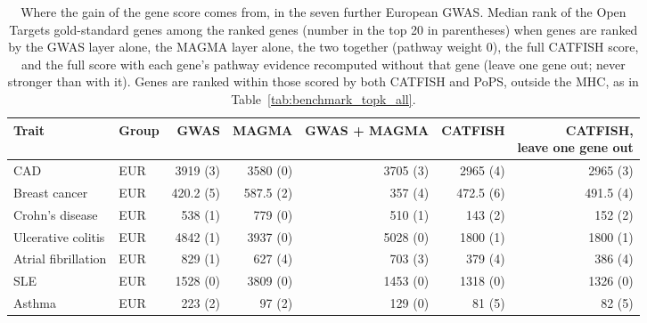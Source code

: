 \begin{table}[!htbp]
\centering
\caption{Where the gain of the gene score comes from, in the seven further European GWAS. Median rank of the Open Targets gold-standard genes among the ranked genes (number in the top 20 in parentheses) when genes are ranked by the GWAS layer alone, the MAGMA layer alone, the two together (pathway weight $0$), the full CATFISH score, and the full score with each gene's pathway evidence recomputed without that gene (leave one gene out; never stronger than with it). Genes are ranked within those scored by both CATFISH and PoPS, outside the MHC, as in Table~\ref{tab:benchmark_topk_all}.}
\label{tab:logo_recovery_bench}
\small
\begin{tabular*}{\linewidth}{@{\extracolsep{\fill}}llrrrrr}
\hline
\textbf{Trait} & \textbf{Group} & GWAS & MAGMA & GWAS + MAGMA & CATFISH & \makecell[r]{CATFISH,\\leave one gene out} \\
\hline
CAD & EUR & 3919 (3) & 3580 (0) & 3705 (3) & 2965 (4) & 2965 (3) \\
Breast cancer & EUR & 420.2 (5) & 587.5 (2) & 357 (4) & 472.5 (6) & 491.5 (4) \\
Crohn's disease & EUR & 538 (1) & 779 (0) & 510 (1) & 143 (2) & 152 (2) \\
Ulcerative colitis & EUR & 4842 (1) & 3937 (0) & 5028 (0) & 1800 (1) & 1800 (1) \\
Atrial fibrillation & EUR & 829 (1) & 627 (4) & 703 (3) & 379 (4) & 386 (4) \\
SLE & EUR & 1528 (0) & 3809 (0) & 1453 (0) & 1318 (0) & 1326 (0) \\
Asthma & EUR & 223 (2) & 97 (2) & 129 (0) & 81 (5) & 82 (5) \\
\hline
\end{tabular*}
\end{table}
